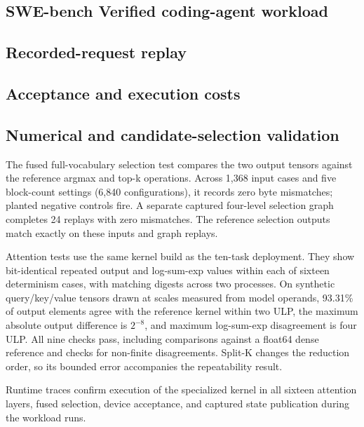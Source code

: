 \documentclass[conference]{IEEEtran}
\begin{document}
\subsection{SWE-bench Verified coding-agent workload}
\label{sec:agent-workload}


\subsection{Recorded-request replay}
\label{sec:request-replay}


\subsection{Acceptance and execution costs}


\subsection{Numerical and candidate-selection validation}
\label{sec:current-validation}


The fused full-vocabulary selection test compares the two output tensors against the reference argmax and top-k operations. Across 1,368 input cases and five block-count settings (6,840 configurations), it records zero byte mismatches; planted negative controls fire. A separate captured four-level selection graph completes 24 replays with zero mismatches. The reference selection outputs match exactly on these inputs and graph replays.

Attention tests use the same kernel build as the ten-task deployment. They show bit-identical repeated output and log-sum-exp values within each of sixteen determinism cases, with matching digests across two processes. On synthetic query/key/value tensors drawn at scales measured from model operands, 93.31\% of output elements agree with the reference kernel within two ULP, the maximum absolute output difference is $2^{-8}$, and maximum log-sum-exp disagreement is four ULP. All nine checks pass, including comparisons against a float64 dense reference and checks for non-finite disagreements. Split-K changes the reduction order, so its bounded error accompanies the repeatability result.

Runtime traces confirm execution of the specialized kernel in all sixteen attention layers, fused selection, device acceptance, and captured state publication during the workload runs.
\end{document}
